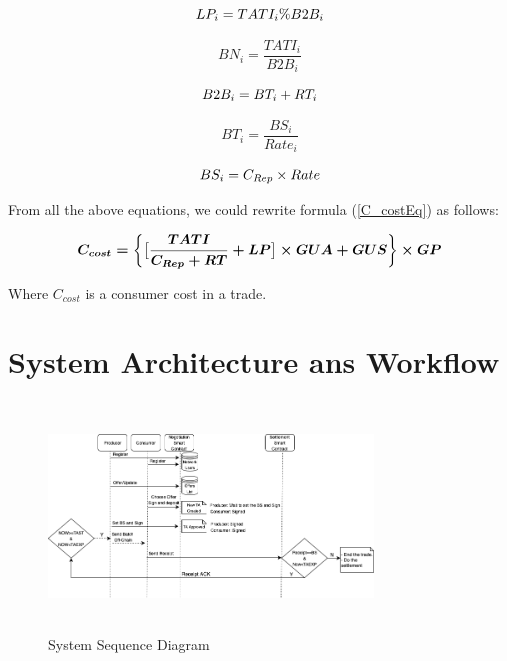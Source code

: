 \documentclass[letterpaper, 10 pt, conference]{ieeeconf}  %
\makeatletter
\newcommand{\mathleft}{\@fleqntrue\@mathmargin15pt}
\newcommand{\mathcenter}{\@fleqnfalse}
\makeatother
\begin{document}
\mathleft
\begin{equation}
\textbf{$ LP _{i} = TATI _{i}  \%  B2B _{i} $}   
\end{equation}

\vspace{-0.5 cm}

\mathleft
\begin{equation}
BN _{i} = \frac{TATI _{i}}{B2B _{i}}
\end{equation}

\vspace{-0.5 cm}

\mathleft
\begin{equation}
\textbf{$ B2B _{i} = BT _{i} + RT _{i}$}    
\end{equation}

\vspace{-0.5 cm}

\mathleft
\begin{equation}
BT _{i} = \frac{BS _{i}}{Rate _{i} } 
\end{equation}

\vspace{-0.5 cm}

\mathleft
\begin{equation}
\textbf{$ BS _{i} = C_{Rep} \times Rate $}    
\end{equation}

\vspace{0.5 cm}

From all the above equations, we could rewrite formula (\ref{C_costEq}) as follows:

\begin{equation} \label{FCostEq}
\boldmath C_{cost} = \bigg\{ \big[ \frac{TATI}{C_{Rep}+RT} + LP\big] \times GUA + GUS \bigg\}\times GP
\end{equation}


Where $C_{cost}$ is a consumer cost in a trade.

\section{System Architecture ans Workflow} \label{Arch}

\begin{figure}
  \caption{System Sequence Diagram}
  \label{SSD}
  \includegraphics[height= 2.4in, width=3.4in]{SystemArchWithBackground}
  \centering
\end{figure}
\end{document}
